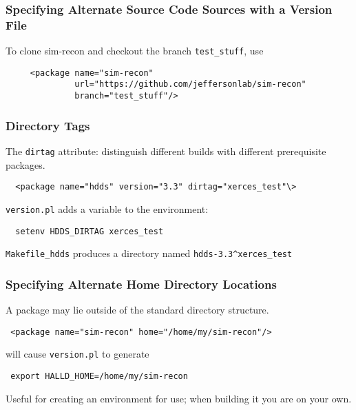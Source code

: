 \documentclass{beamer}
\begin{document}
\begin{frame}[fragile]
  \frametitle{Specifying Alternate Source Code Sources with a Version File}
To clone sim-recon and checkout the branch {\tt test\_stuff}, use
\begin{verbatim}
     <package name="sim-recon"
              url="https://github.com/jeffersonlab/sim-recon"
              branch="test_stuff"/>
\end{verbatim}

\end{frame}
\begin{frame}[fragile]
  \frametitle{Directory Tags}\label{section:directory-tags}

The {\tt dirtag} attribute: distinguish different builds with different prerequisite packages.
\begin{verbatim}
  <package name="hdds" version="3.3" dirtag="xerces_test"\>
\end{verbatim}
{\tt version.pl} adds a variable to the environment:
\begin{verbatim}
  setenv HDDS_DIRTAG xerces_test
\end{verbatim}
{\tt Makefile\_hdds} produces a directory named {\tt hdds-3.3\^{}xerces\_test}

\end{frame}
\begin{frame}
  \frametitle{Specifying Alternate Home Directory Locations}

A package may lie outside of the standard directory structure.
\begin{center} \tt
<package name="sim-recon" home="/home/my/sim-recon"/>
\end{center}
will cause {\tt version.pl} to generate
\begin{center} \tt
export HALLD\_HOME=/home/my/sim-recon
\end{center}
Useful for creating an environment for use; when building it you are on your own.

\end{frame}
\end{document}
